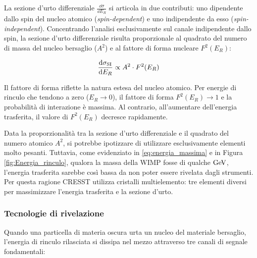 La sezione d'urto differenziale $\frac{\dd\sigma}{\dd E_R}$ si articola in due contributi: uno dipendente dallo spin del nucleo atomico (\textit{spin-dependent}) e uno indipendente da esso (\textit{spin-independent}). Concentrando l'analisi esclusivamente sul canale indipendente dallo spin, la sezione d'urto differenziale risulta proporzionale al quadrato del numero di massa del nucleo bersaglio ($A^2$) e al fattore di forma nucleare $F^2(E_R)$:

\begin{equation}
\frac{\dd\sigma_{\mathrm{SI}}}{\dd E_R} \propto A^2 \cdot F^2(E_R)
\end{equation}

Il fattore di forma riflette la natura estesa del nucleo atomico. Per energie di rinculo che tendono a zero ($E_R \to 0$), il fattore di forma $F^2(E_R) \to 1$ e la probabilità di interazione è massima. Al contrario, all'aumentare dell'energia trasferita, il valore di $F^2(E_R)$ decresce rapidamente.

Data la proporzionalità tra la sezione d'urto differenziale e il quadrato del numero atomico $A^2$, si potrebbe ipotizzare di utilizzare esclusivamente elementi molto pesanti. Tuttavia, come evidenziato in \ref{eq:energia_massima} e in Figura \ref{fig:Energia_rinculo}, qualora la massa della WIMP fosse di qualche $\mathrm{GeV}$, l'energia trasferita sarebbe così bassa da non poter essere rivelata dagli strumenti. Per questa ragione CRESST utilizza cristalli multielemento: tre elementi diversi per massimizzare l'energia trasferita e la sezione d'urto.

\subsubsection{Tecnologie di rivelazione}
\label{subsubsec:canali_segnali}

Quando una particella di materia oscura urta un nucleo del materiale bersaglio, l'energia di rinculo rilasciata si dissipa nel mezzo attraverso tre canali di segnale fondamentali:

